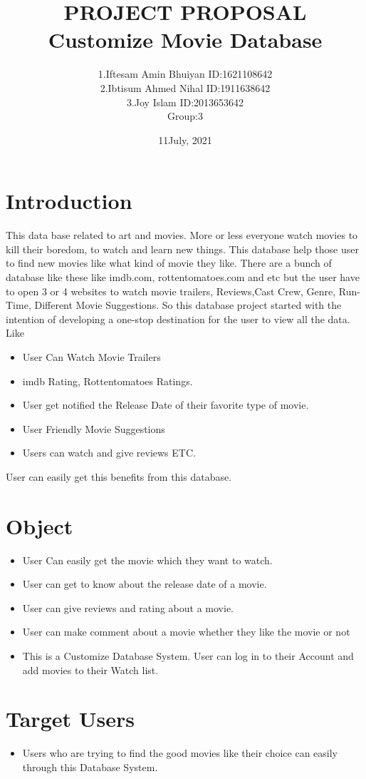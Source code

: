 \documentclass{report}
\title{PROJECT PROPOSAL\\
Customize Movie Database}
\author{1.Iftesam Amin Bhuiyan ID:1621108642\\2.Ibtisum Ahmed Nihal ID:1911638642\\3.Joy Islam ID:2013653642\\Group:3}
\date{11July, 2021}
\begin{document}
\maketitle
\tableofcontents
\newpage
\section{Introduction}
This data base related to art and movies. More or less everyone watch movies to kill their boredom, to watch and learn new things. This database help those user to find new movies like what kind of movie they like. There are a bunch of database like these like imdb.com, rottentomatoes.com and etc but the user have to open 3 or 4 websites to watch movie trailers, Reviews,Cast Crew, Genre, Run-Time, Different Movie Suggestions. So this database project started with the intention of developing a one-stop destination for the user to view all the data. Like
\begin{itemize}
\item User Can Watch Movie Trailers
\item imdb Rating, Rottentomatoes Ratings.
\item User get notified the Release Date of their favorite type of movie. 
\item User Friendly Movie Suggestions
\item Users can watch and give reviews ETC.

\end{itemize}
User can easily get this benefits from this database. 

\section{Object}
\begin{itemize}
\item User Can easily get the movie which they want to watch.
\item User can get to know about the release date of a movie. 
\item User can give reviews and rating about a movie.
\item User can make comment about a movie whether they like the movie or not 
\item This is a Customize Database System. User can log in to their Account and add movies to their Watch list. 

\end{itemize}

\section{Target Users}
\begin{itemize}
\item Users who are trying to find the good movies like their choice can easily through this Database System.  
\end{itemize}
\end{document}
